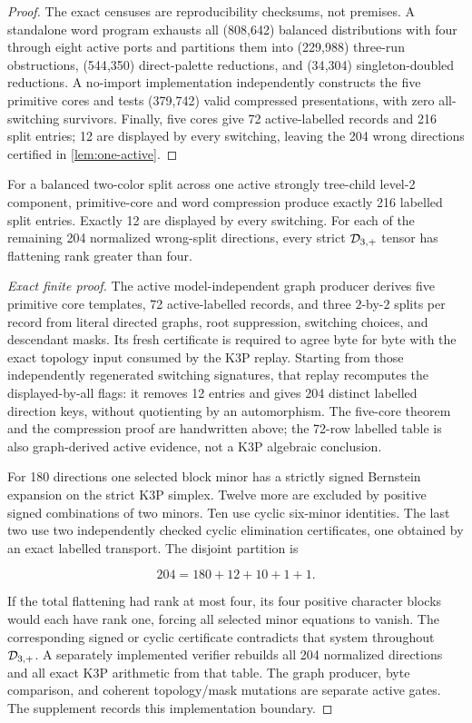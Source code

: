 \begin{proof}
The exact censuses are reproducibility checksums, not premises.  A standalone
word program exhausts all (808{,}642) balanced distributions with four
through eight active ports and partitions them into (229{,}988) three-run
obstructions, (544{,}350) direct-palette reductions, and (34{,}304)
singleton-doubled reductions.  A no-import implementation independently
constructs the five primitive cores and tests (379{,}742) valid compressed
presentations, with zero all-switching survivors.  Finally, five cores give
72 active-labelled records and 216 split entries; 12 are displayed by every
switching, leaving the 204 wrong directions certified in
\cref{lem:one-active}.
\end{proof}

\begin{lemma}\label{lem:one-active}
For a balanced two-color split across one active strongly tree-child
level-2 component, primitive-core and word compression produce exactly 216
labelled split entries.  Exactly 12 are displayed by every switching.
For each of the remaining 204 normalized wrong-split directions, every
strict \(\mathcal D_{3,+}\) tensor has flattening rank greater than four.
\end{lemma}

\begin{proof}[Exact finite proof]
The active model-independent graph producer derives five primitive core
templates, 72 active-labelled records, and three \(2\)-by-\(2\) splits per
record from literal directed graphs, root suppression, switching choices, and
descendant masks.  Its fresh certificate is required to agree byte for byte
with the exact topology input consumed by the K3P replay.  Starting from those
independently regenerated switching signatures, that replay recomputes the
displayed-by-all flags: it removes 12 entries and gives 204 distinct labelled
direction keys, without quotienting by an automorphism.  The five-core theorem
and the compression proof are handwritten above; the 72-row labelled table is
also graph-derived active evidence, not a K3P algebraic conclusion.

For 180 directions one selected block minor has a strictly signed
Bernstein expansion on the strict K3P simplex.  Twelve more are excluded by
positive signed combinations of two minors.  Ten use cyclic six-minor
identities.  The last two use two independently checked cyclic elimination
certificates, one obtained by an exact labelled transport.  The disjoint
partition is

\[
 204=180+12+10+1+1.
\]

If the total flattening had rank at most four, its four positive character
blocks would each have rank one, forcing all selected minor equations to
vanish.  The corresponding signed or cyclic certificate contradicts that
system throughout \(\mathcal D_{3,+}\).  A separately implemented verifier rebuilds all
204 normalized directions and all exact K3P arithmetic from that table.  The
graph producer, byte comparison, and coherent topology/mask mutations are
separate active gates.  The supplement records this implementation boundary.
\end{proof}

